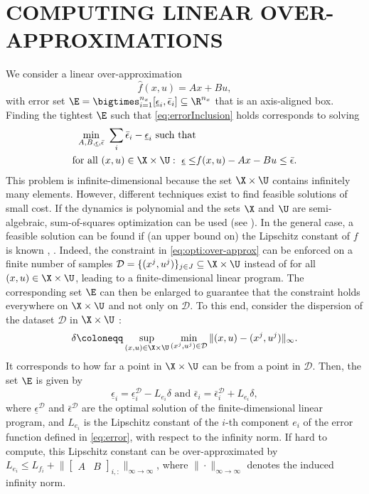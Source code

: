 \documentclass[letterpaper, 10 pt, conference]{ieeeconf}  %
\begin{document}
\section{COMPUTING LINEAR OVER-APPROXIMATIONS} \label{sec:computingOA}
We consider a linear over-approximation
$$
\hat{f}(x,u)=Ax+Bu,
$$
with error set $\E=\bigtimes_{i=1}^{n_x} [\underline{\epsilon}_i,\bar{\epsilon}_i]\subseteq\R^{n_x}$ that is an axis-aligned box. Finding the tightest $\E$ such that \eqref{eq:errorInclusion} holds corresponds to solving
\begin{align}
\min_{A,B,\underline{\epsilon},\bar{\epsilon}}\ \sum_i\bar{\epsilon}_i-\underline{\epsilon}_i \text{ such that}& \label{eq:opti:over-approx} \\
\text{for all } (x,u)\in\X\times\U:\ \underline{\epsilon}\leq& f(x,u)-Ax-Bu\leq\bar{\epsilon}.\notag
\end{align}
This problem is infinite-dimensional because the set $\X\times\U$ contains infinitely many elements. However, different techniques exist to find feasible solutions of small cost. If the dynamics is polynomial and the sets $\X$ and $\U$ are semi-algebraic, sum-of-squares optimization can be used (see \cite[Section~4.1]{aspeel2024simulation}). In the general case, a feasible solution can be found if (an upper bound on) the Lipschitz constant of $f$ is known \cite{malherbe2017global}, \cite[Section~IV-A]{balim2023koopman}. Indeed, the constraint in \eqref{eq:opti:over-approx} can be enforced on a finite number of samples $\mathcal{D}=\{(x^j,u^j)\}_{j\in J}\subseteq\X\times\U$ instead of for all $(x,u)\in\X\times\U$, leading to a finite-dimensional linear program. The corresponding set $\E$ can then be enlarged to guarantee that the constraint holds everywhere on $\X\times\U$ and not only on $\mathcal{D}$. To this end, consider the dispersion of the dataset $\mathcal{D}$ in $\X\times\U$ \cite[Section~5.2.3]{lavalle2006planning}:
$$
\delta\coloneqq \sup_{(x,u)\in\X\times\U}\min_{(x^j,u^j)\in\mathcal{D}} \|(x,u)-(x^j,u^j)\|_\infty.
$$
It corresponds to how far a point in $\X\times\U$ can be from a point in $\mathcal{D}$. Then, the set $\E$ is given by
$$
\underline{\epsilon}_i= \underline{\epsilon}_i^\mathcal{D}-L_{e_i}\delta \text{ and } \bar{\epsilon}_i = \bar{\epsilon}_i^\mathcal{D}+L_{e_i}\delta,
$$
where $\underline{\epsilon}^\mathcal{D}$ and $\bar{\epsilon}^\mathcal{D}$ are the optimal solution of the finite-dimensional linear program, and $L_{e_i}$ is the Lipschitz constant of the $i$-th component $e_i$ of the error function defined in \eqref{eq:error}, with respect to the infinity norm. If hard to compute, this Lipschitz constant can be over-approximated by $L_{e_i}\leq L_{f_i}+\lVert \begin{bmatrix} A & B \end{bmatrix}_{i,:} \rVert_{\infty\rightarrow\infty}$, where $\|\cdot\|_{\infty\rightarrow\infty}$ denotes the induced infinity norm.
\end{document}
